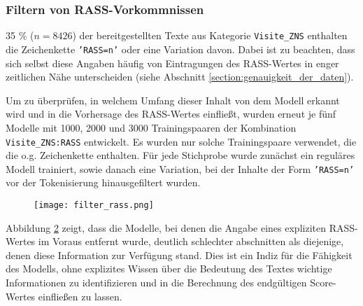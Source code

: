 \begin{figure}[ht]
    \centering
    \caption{}
    \label{fig:svm_hists}
\end{figure}


\subsubsection{Filtern von RASS-Vorkommnissen}

35 \% ($n=8426$) der bereitgestellten Texte aus Kategorie \texttt{Visite\_ZNS} enthalten die Zeichenkette \texttt{'RASS=n'} oder eine Variation davon. Dabei ist zu beachten, dass sich selbst diese Angaben häufig von Eintragungen des RASS-Wertes in enger zeitlichen Nähe unterscheiden (siehe Abschnitt \ref{section:genauigkeit_der_daten}).

Um zu überprüfen, in welchem Umfang dieser Inhalt von dem Modell erkannt wird und in die Vorhersage des RASS-Wertes einfließt, wurden erneut je fünf Modelle mit 1000, 2000 und 3000 Trainingspaaren der Kombination \texttt{Visite\_ZNS:RASS} entwickelt. Es wurden nur solche Trainingspaare verwendet, die die o.g. Zeichenkette enthalten. Für jede Stichprobe wurde zunächst ein reguläres Modell trainiert, sowie danach eine Variation, bei der Inhalte der Form \texttt{'RASS=n'} vor der Tokenisierung hinausgefiltert wurden.

\begin{figure}[htb]
    \captionsetup{justification=centering}
    \centering
    \texttt{[image: filter\_rass.png]}
    \caption{}
    \label{fig:filterrass}
\end{figure}

Abbildung \ref{fig:filterrass} zeigt, dass die Modelle, bei denen die Angabe eines expliziten RASS-Wertes im Voraus entfernt wurde, deutlich schlechter abschnitten als diejenige, denen diese Information zur Verfügung stand. Dies ist ein Indiz für die Fähigkeit des Modells, ohne explizites Wissen über die Bedeutung des Textes wichtige Informationen zu identifizieren und in die Berechnung des endgültigen Score-Wertes einfließen zu lassen.